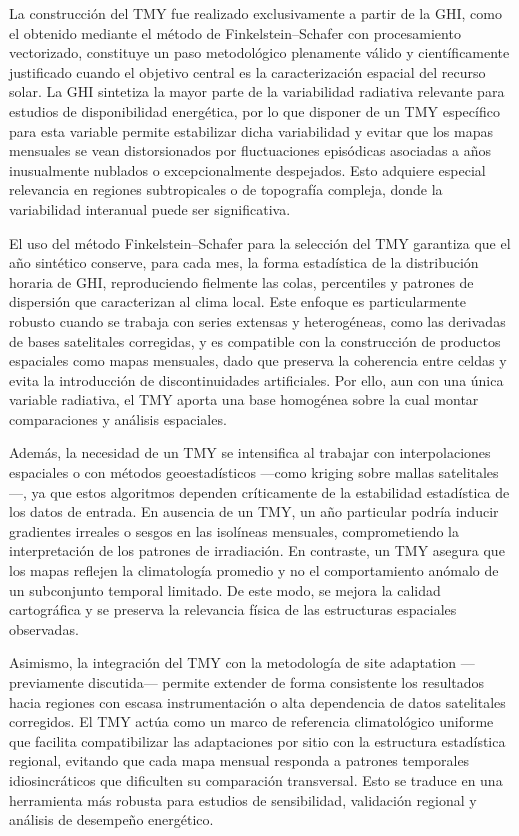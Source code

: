 La construcción del TMY fue realizado exclusivamente a partir de la GHI, como el obtenido mediante el método de Finkelstein–Schafer con procesamiento vectorizado, constituye un paso metodológico plenamente válido y científicamente justificado cuando el objetivo central es la caracterización espacial del recurso solar. La GHI sintetiza la mayor parte de la variabilidad radiativa relevante para estudios de disponibilidad energética, por lo que disponer de un TMY específico para esta variable permite estabilizar dicha variabilidad y evitar que los mapas mensuales se vean distorsionados por fluctuaciones episódicas asociadas a años inusualmente nublados o excepcionalmente despejados. Esto adquiere especial relevancia en regiones subtropicales o de topografía compleja, donde la variabilidad interanual puede ser significativa.

El uso del método Finkelstein–Schafer para la selección del TMY garantiza que el año sintético conserve, para cada mes, la forma estadística de la distribución horaria de GHI, reproduciendo fielmente las colas, percentiles y patrones de dispersión que caracterizan al clima local. Este enfoque es particularmente robusto cuando se trabaja con series extensas y heterogéneas, como las derivadas de bases satelitales corregidas, y es compatible con la construcción de productos espaciales como mapas mensuales, dado que preserva la coherencia entre celdas y evita la introducción de discontinuidades artificiales. Por ello, aun con una única variable radiativa, el TMY aporta una base homogénea sobre la cual montar comparaciones y análisis espaciales.

Además, la necesidad de un TMY se intensifica al trabajar con interpolaciones espaciales o con métodos geoestadísticos —como kriging sobre mallas satelitales—, ya que estos algoritmos dependen críticamente de la estabilidad estadística de los datos de entrada. En ausencia de un TMY, un año particular podría inducir gradientes irreales o sesgos en las isolíneas mensuales, comprometiendo la interpretación de los patrones de irradiación. En contraste, un TMY asegura que los mapas reflejen la climatología promedio y no el comportamiento anómalo de un subconjunto temporal limitado. De este modo, se mejora la calidad cartográfica y se preserva la relevancia física de las estructuras espaciales observadas.

Asimismo, la integración del TMY con la metodología de site adaptation —previamente discutida— permite extender de forma consistente los resultados hacia regiones con escasa instrumentación o alta dependencia de datos satelitales corregidos. El TMY actúa como un marco de referencia climatológico uniforme que facilita compatibilizar las adaptaciones por sitio con la estructura estadística regional, evitando que cada mapa mensual responda a patrones temporales idiosincráticos que dificulten su comparación transversal. Esto se traduce en una herramienta más robusta para estudios de sensibilidad, validación regional y análisis de desempeño energético.

